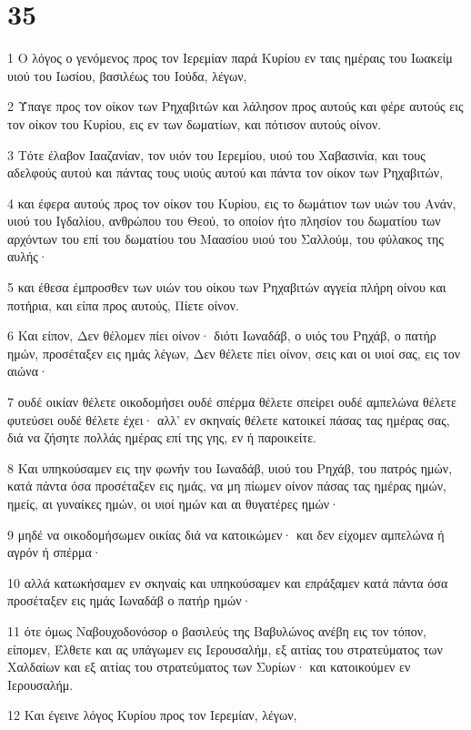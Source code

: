 \chapter{35}

\par 1 Ο λόγος ο γενόμενος προς τον Ιερεμίαν παρά Κυρίου εν ταις ημέραις του Ιωακείμ υιού του Ιωσίου, βασιλέως του Ιούδα, λέγων,
\par 2 Ύπαγε προς τον οίκον των Ρηχαβιτών και λάλησον προς αυτούς και φέρε αυτούς εις τον οίκον του Κυρίου, εις εν των δωματίων, και πότισον αυτούς οίνον.
\par 3 Τότε έλαβον Ιααζανίαν, τον υιόν του Ιερεμίου, υιού του Χαβασινία, και τους αδελφούς αυτού και πάντας τους υιούς αυτού και πάντα τον οίκον των Ρηχαβιτών,
\par 4 και έφερα αυτούς προς τον οίκον του Κυρίου, εις το δωμάτιον των υιών του Ανάν, υιού του Ιγδαλίου, ανθρώπου του Θεού, το οποίον ήτο πλησίον του δωματίου των αρχόντων του επί του δωματίου του Μαασίου υιού του Σαλλούμ, του φύλακος της αυλής·
\par 5 και έθεσα έμπροσθεν των υιών του οίκου των Ρηχαβιτών αγγεία πλήρη οίνου και ποτήρια, και είπα προς αυτούς, Πίετε οίνον.
\par 6 Και είπον, Δεν θέλομεν πίει οίνον· διότι Ιωναδάβ, ο υιός του Ρηχάβ, ο πατήρ ημών, προσέταξεν εις ημάς λέγων, Δεν θέλετε πίει οίνον, σεις και οι υιοί σας, εις τον αιώνα·
\par 7 ουδέ οικίαν θέλετε οικοδομήσει ουδέ σπέρμα θέλετε σπείρει ουδέ αμπελώνα θέλετε φυτεύσει ουδέ θέλετε έχει· αλλ' εν σκηναίς θέλετε κατοικεί πάσας τας ημέρας σας, διά να ζήσητε πολλάς ημέρας επί της γης, εν ή παροικείτε.
\par 8 Και υπηκούσαμεν εις την φωνήν του Ιωναδάβ, υιού του Ρηχάβ, του πατρός ημών, κατά πάντα όσα προσέταξεν εις ημάς, να μη πίωμεν οίνον πάσας τας ημέρας ημών, ημείς, αι γυναίκες ημών, οι υιοί ημών και αι θυγατέρες ημών·
\par 9 μηδέ να οικοδομήσωμεν οικίας διά να κατοικώμεν· και δεν είχομεν αμπελώνα ή αγρόν ή σπέρμα·
\par 10 αλλά κατωκήσαμεν εν σκηναίς και υπηκούσαμεν και επράξαμεν κατά πάντα όσα προσέταξεν εις ημάς Ιωναδάβ ο πατήρ ημών·
\par 11 ότε όμως Ναβουχοδονόσορ ο βασιλεύς της Βαβυλώνος ανέβη εις τον τόπον, είπομεν, Έλθετε και ας υπάγωμεν εις Ιερουσαλήμ, εξ αιτίας του στρατεύματος των Χαλδαίων και εξ αιτίας του στρατεύματος των Συρίων· και κατοικούμεν εν Ιερουσαλήμ.
\par 12 Και έγεινε λόγος Κυρίου προς τον Ιερεμίαν, λέγων,
